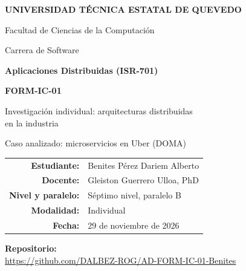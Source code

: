 \documentclass[12pt,a4paper]{article}
\newcommand{\repourl}{https://github.com/DALBEZ-ROG/AD-FORM-IC-01-Benites}
\newcommand{\fecha}{29 de noviembre de 2026}
\begin{document}
\begin{center}
  {\Large\bfseries UNIVERSIDAD TÉCNICA ESTATAL DE QUEVEDO\par}
  \vspace{4pt}
  {\large Facultad de Ciencias de la Computación\par}
  {\large Carrera de Software\par}
  \vspace{1.6cm}
  {\large\bfseries Aplicaciones Distribuidas (ISR-701)\par}
  \vspace{0.8cm}
  {\Large\bfseries FORM-IC-01\par}
  \vspace{4pt}
  {\large Investigación individual: arquitecturas distribuidas\\ en la industria\par}
  \vspace{4pt}
  {Caso analizado: microservicios en Uber (DOMA)\par}
\end{center}

\vspace{1.4cm}
\begin{center}
\renewcommand{\arraystretch}{1.5}
\begin{tabular}{>{\bfseries}r l}
  Estudiante:  & Benites Pérez Dariem Alberto \\
  Docente:     & Gleiston Guerrero Ulloa, PhD \\
  Nivel y paralelo: & Séptimo nivel, paralelo B \\
  Modalidad:   & Individual \\
  Fecha:       & \fecha \\
\end{tabular}
\end{center}

\vfill
\begin{center}
  {\bfseries Repositorio:}\\[4pt]
  {\small\url{\repourl}}
\end{center}
\vspace{1cm}
\end{document}
